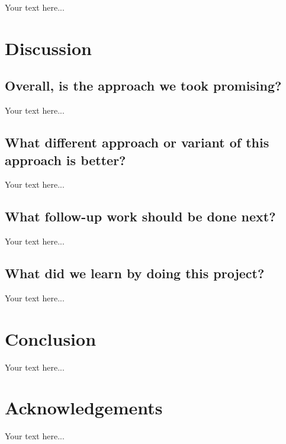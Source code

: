 \documentclass[accepted,single]{gipaper}
\begin{document}
Your text here...


\section{Discussion}

\subsection{Overall, is the approach we took promising?}

Your text here...

\subsection{What different approach or variant of this approach is better?}

Your text here...

\subsection{What follow-up work should be done next?}

Your text here...

\subsection{What did we learn by doing this project? }

Your text here...


\section{Conclusion}

Your text here...


\section*{Acknowledgements}

Your text here...




\end{document}

